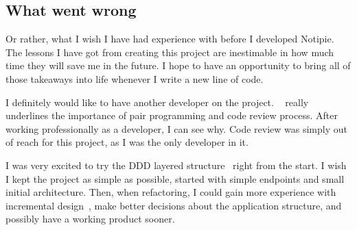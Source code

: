 \subsection{What went wrong}\label{sec:what-went-wrong}

Or rather,
what I wish I have had experience with
before I developed Notipie.
The lessons I have got from creating this project
are inestimable in how much time they will save me
in the future.
I hope to have an opportunity to
bring all of those takeaways into life
whenever I write a new line of code.

I definitely would like to have another developer
on the project.
~\cite{beck_extreme_2004}
really underlines the importance of pair programming
and code review process.
After working professionally as a developer,
I can see why.
Code review was simply out of reach for this project,
as I was the only developer in it.

I was very excited to try the
DDD layered structure~\cite{evans_domain-driven_2003}
right from the start.
I wish I kept the project as simple as possible,
started with simple endpoints
and small initial architecture.
Then, when refactoring,
I could gain more experience
with incremental design~\cite{fowler_refactoring_2019,beck_extreme_2004},
make better decisions about the application structure,
and possibly have a working product sooner.
